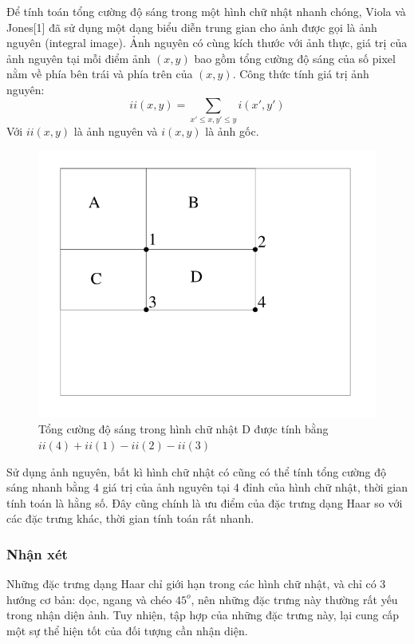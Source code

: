 \documentclass[14pt, oneside, a4paper, openany]{scrartcl}
\begin{document}
Để tính toán tổng cường độ sáng trong một hình chữ nhật nhanh chóng, Viola và Jones[1] đã sử dụng một dạng biểu diễn trung gian cho ảnh được gọi là ảnh nguyên (integral image). Ảnh nguyên có cùng kích thước với ảnh thực, giá trị của ảnh nguyên tại mỗi điểm ảnh $(x,y)$ bao gồm tổng cường độ sáng của số pixel nằm về phía bên trái và phía trên của $(x,y)$. Công thức tính giá trị ảnh nguyên:
$$
ii(x,y) = \sum_{x' \leq x, y' \leq y} i(x',y')
$$
Với $ii(x,y)$ là ảnh nguyên và $i(x,y)$ là ảnh gốc.
\begin{figure}
	\centering
	\includegraphics[scale=0.5]{figures/integralImage.png} 
	\caption[Tổng cường độ sáng trong hình chữ nhật]{Tổng cường độ sáng trong hình chữ nhật D được tính bằng $ii(4) + ii(1) - ii(2) - ii(3)$}
\end{figure}
Sử dụng ảnh nguyên, bất kì hình chữ nhật có cũng có thể tính tổng cường độ sáng nhanh bằng 4 giá trị của ảnh nguyên tại 4 đỉnh của hình chữ nhật, thời gian tính toán là hằng số. Đây cũng chính là ưu điểm của đặc trưng dạng Haar so với các đặc trưng khác, thời gian tính toán rất nhanh.

\subsubsection{Nhận xét}
Những đặc trưng dạng Haar chỉ giới hạn trong các hình chữ nhật, và chỉ có 3 hướng cơ bản: dọc, ngang và chéo $45^o$, nên những đặc trưng này thường rất yếu trong nhận diện ảnh. Tuy nhiện, tập hợp của những đặc trưng này, lại cung cấp một sự thể hiện tốt của đối tượng cần nhận diện.
\end{document}
